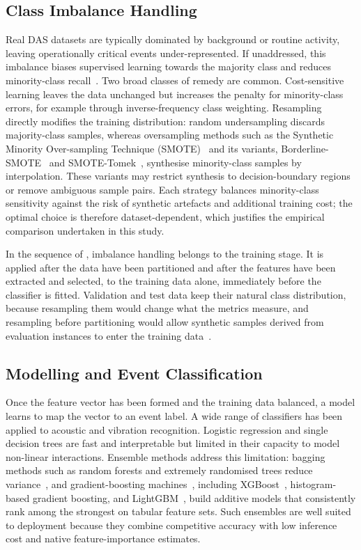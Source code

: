\subsection{Class Imbalance Handling}
\label{sec:chap2ClassImbalance}
Real DAS datasets are typically dominated by background or routine activity, leaving operationally critical events under-represented. If unaddressed, this imbalance biases supervised learning towards the majority class and reduces minority-class recall~\cite{shen2024abnormal}. Two broad classes of remedy are common. Cost-sensitive learning leaves the data unchanged but increases the penalty for minority-class errors, for example through inverse-frequency class weighting. Resampling directly modifies the training distribution: random undersampling discards majority-class samples, whereas oversampling methods such as the Synthetic Minority Over-sampling Technique (SMOTE)~\cite{chawla2002smote} and its variants, Borderline-SMOTE~\cite{han2005borderline} and SMOTE-Tomek~\cite{batista2004balancing}, synthesise minority-class samples by interpolation. These variants may restrict synthesis to decision-boundary regions or remove ambiguous sample pairs. Each strategy balances minority-class sensitivity against the risk of synthetic artefacts and additional training cost; the optimal choice is therefore dataset-dependent, which justifies the empirical comparison undertaken in this study.

In the sequence of , imbalance handling belongs to the training stage. It is applied after the data have been partitioned and after the features have been extracted and selected, to the training data alone, immediately before the classifier is fitted. Validation and test data keep their natural class distribution, because resampling them would change what the metrics measure, and resampling before partitioning would allow synthetic samples derived from evaluation instances to enter the training data~\cite{santos2018imbalanced}.

\subsection{Modelling and Event Classification}
\label{sec:chap2Classifiers}
Once the feature vector has been formed and the training data balanced, a model learns to map the vector to an event label. A wide range of classifiers has been applied to acoustic and vibration recognition. Logistic regression and single decision trees are fast and interpretable but limited in their capacity to model non-linear interactions. Ensemble methods address this limitation: bagging methods such as random forests and extremely randomised trees reduce variance~\cite{breiman2001randomforests,geurts2006extremely}, and gradient-boosting machines~\cite{friedman2001greedy}, including XGBoost~\cite{chen2016xgboost}, histogram-based gradient boosting, and LightGBM~\cite{ke2017lightgbm}, build additive models that consistently rank among the strongest on tabular feature sets. Such ensembles are well suited to deployment because they combine competitive accuracy with low inference cost and native feature-importance estimates.


